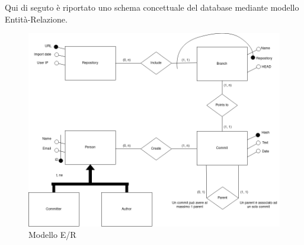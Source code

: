 Qui di seguto è riportato uno schema concettuale del database mediante modello Entità-Relazione.
\begin{figure}[htp]
\centering
\includegraphics[scale=0.5]{data/er.png}
\caption{Modello E/R}
\label{}
\end{figure}